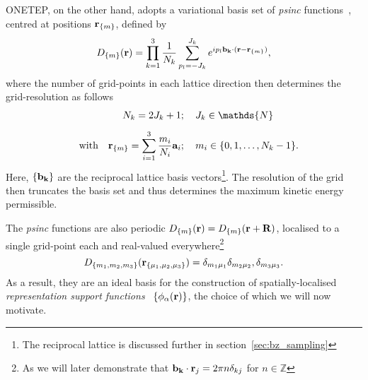 {
{\sc ONETEP}, on the other hand, 
adopts a variational basis set of {\it psinc} 
functions~\cite{doi:10.1063/1.1613633,0305-4470-19-11-013}, 
centred at positions ${{\bf r}}_{\{m\}}$, 
defined by 
%
\begin{equation}
D_{\{m\}}({\bf r})=\prod_{k=1}^{3}\frac{1}{N_k}\sum_{p_l=-J_k}^{J_k} 
e^{ip_l{\bf b_k}\cdot({\bf r}-{\bf r}_{\{m\}})},
\end{equation}
where the number of grid-points 
in each lattice direction then 
determines the grid-resolution as follows 
%
\begin{align}
N_k=2J_k+1&;\quad  J_k\in \mathds{N} \nonumber\\[0.5em]
\quad\mbox{with}\quad
{\br}_{\{m\}}=\sum_{i=1}^3 \frac{m_i}{N_i}{\bf a}_i&;\quad
m_i\in\{0,1,\ldots,N_k-1\}.
\end{align}
%
Here, $\{\bf b_k\}$ are the reciprocal lattice 
basis vectors\footnote{The reciprocal lattice is discussed further in section~\ref{sec:bz_sampling}}.
%
The resolution of the grid then truncates the basis set 
and thus determines 
the maximum kinetic energy permissible.

The {\it psinc} functions are also periodic 
$D_{\{m\}}({\bf r})=D_{\{m\}}({\bf r}+{\bf R})$, 
localised to a single grid-point each 
and real-valued everywhere\footnote{{As we will later demonstrate that 
${\bf b_k}\cdot{{\bf r}_j}=2\pi n\delta_{kj}$ for $n\in\mathds{Z}$}
}~\cite{doi:10.1063/1.1613633}
%
\begin{equation}
D_{\{m_1,m_2,m_3\}}({\bf r}_{\{\mu_1,\mu_2,\mu_3\}})
=\delta_{m_1\mu_1}\delta_{m_2\mu_2},\delta_{m_3\mu_3}.
\end{equation}
%
As a result, they are an ideal basis for 
the construction of spatially-localised 
{\it representation support functions}~\cite{PhysRevB.51.10157} 
$\{\phi_\alpha({\bf r})\}$, 
the choice of which we will now motivate.}
%

